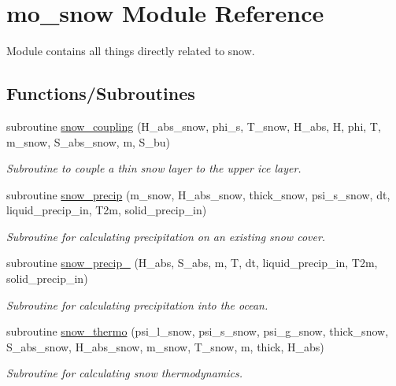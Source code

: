 \hypertarget{namespacemo__snow}{
\section{mo\_\-snow Module Reference}
\label{namespacemo__snow}
}


Module contains all things directly related to snow.  


\subsection*{Functions/Subroutines}
\begin{DoxyCompactItemize}
\item 
subroutine \hyperlink{namespacemo__snow_a846b1d8e0ce528570ee66f641db97eef}{snow\_\-coupling} (H\_\-abs\_\-snow, phi\_\-s, T\_\-snow, H\_\-abs, H, phi, T, m\_\-snow, S\_\-abs\_\-snow, m, S\_\-bu)
\begin{DoxyCompactList}\small\item\em Subroutine to couple a thin snow layer to the upper ice layer. \item\end{DoxyCompactList}\item 
subroutine \hyperlink{namespacemo__snow_a39b7e4b579b1dfddc8555bfcd57b5397}{snow\_\-precip} (m\_\-snow, H\_\-abs\_\-snow, thick\_\-snow, psi\_\-s\_\-snow, dt, liquid\_\-precip\_\-in, T2m, solid\_\-precip\_\-in)
\begin{DoxyCompactList}\small\item\em Subroutine for calculating precipitation on an existing snow cover. \item\end{DoxyCompactList}\item 
subroutine \hyperlink{namespacemo__snow_a4c98864b01acc61ff6b6ef62c9c79fa6}{snow\_\-precip\_} (H\_\-abs, S\_\-abs, m, T, dt, liquid\_\-precip\_\-in, T2m, solid\_\-precip\_\-in)
\begin{DoxyCompactList}\small\item\em Subroutine for calculating precipitation into the ocean. \item\end{DoxyCompactList}\item 
subroutine \hyperlink{namespacemo__snow_a72eb7157143136ae8ccba8de71c74a04}{snow\_\-thermo} (psi\_\-l\_\-snow, psi\_\-s\_\-snow, psi\_\-g\_\-snow, thick\_\-snow, S\_\-abs\_\-snow, H\_\-abs\_\-snow, m\_\-snow, T\_\-snow, m, thick, H\_\-abs)
\begin{DoxyCompactList}\small\item\em Subroutine for calculating snow thermodynamics. \item\end{DoxyCompactList}\item 

\end{DoxyCompactItemize}
